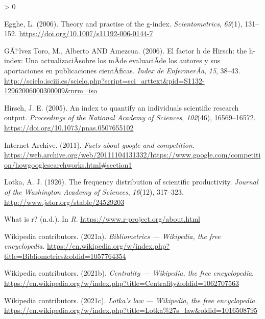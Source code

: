 \documentclass[
]{article}
\newlength{\cslhangindent}
\newenvironment{CSLReferences}[2] %
 {%
  \setlength{\parindent}{0pt}
  \ifodd #1 \everypar{\setlength{\hangindent}{\cslhangindent}}\ignorespaces\fi
  \ifnum #2 > 0
  \setlength{\parskip}{#2\baselineskip}
  \fi
 }%
 {}
\begin{document}
\begin{CSLReferences}{1}{0}
\leavevmode\hypertarget{ref-Egghe2006}{}%
Egghe, L. (2006). Theory and practise of the g-index.
\emph{Scientometrics}, \emph{69}(1), 131--152.
\url{https://doi.org/10.1007/s11192-006-0144-7}

\leavevmode\hypertarget{ref-Galvez2006}{}%
GÃ!{}`lvez Toro, M., Alberto AND Amezcua. (2006). {El factor h de
Hirsch: the h-index: Una actualizaciÃ{}sobre los mÃ{}de evaluaciÃ{}de
los autores y sus aportaciones en publicaciones cientÃ{}ficas}.
\emph{{Index de EnfermerÃ{}a}}, \emph{15}, 38--43.
\url{http://scielo.isciii.es/scielo.php?script=sci_arttext\&pid=S1132-12962006000300009\&nrm=iso}

\leavevmode\hypertarget{ref-Hirsch2005}{}%
Hirsch, J. E. (2005). An index to quantify an individual{{}}s scientific
research output. \emph{Proceedings of the National Academy of Sciences},
\emph{102}(46), 16569--16572.
\url{https://doi.org/10.1073/pnas.0507655102}

\leavevmode\hypertarget{ref-IAPageRank}{}%
Internet Archive. (2011). \emph{Facts about google and competition}.
\url{https://web.archive.org/web/20111104131332/https://www.google.com/competition/howgooglesearchworks.html\#section1}

\leavevmode\hypertarget{ref-Lotka1926}{}%
Lotka, A. J. (1926). The frequency distribution of scientific
productivity. \emph{Journal of the Washington Academy of Sciences},
\emph{16}(12), 317--323. \url{http://www.jstor.org/stable/24529203}

\leavevmode\hypertarget{ref-whatisr}{}%
What is r? (n.d.). In \emph{R}.
\url{https://www.r-project.org/about.html}

\leavevmode\hypertarget{ref-bibliometrics}{}%
Wikipedia contributors. (2021a). \emph{Bibliometrics --- {Wikipedia}{,}
the free encyclopedia}.
\url{https://en.wikipedia.org/w/index.php?title=Bibliometrics\&oldid=1057764354}

\leavevmode\hypertarget{ref-WikiCentrality}{}%
Wikipedia contributors. (2021b). \emph{Centrality --- {Wikipedia}{,} the
free encyclopedia}.
\url{https://en.wikipedia.org/w/index.php?title=Centrality\&oldid=1062707563}

\leavevmode\hypertarget{ref-LotkasLawWiki}{}%
Wikipedia contributors. (2021c). \emph{Lotka's law --- {Wikipedia}{,}
the free encyclopedia}.
\url{https://en.wikipedia.org/w/index.php?title=Lotka\%27s_law\&oldid=1016508795}

\end{CSLReferences}
\end{document}
